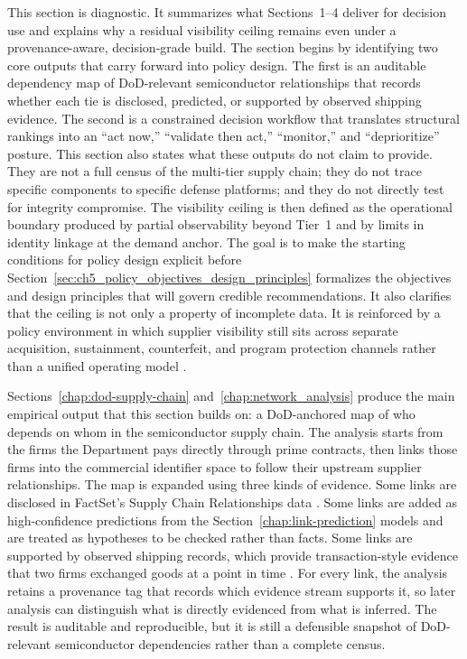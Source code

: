 This section is diagnostic. It summarizes what Sections~1--4 deliver for decision use and explains why a residual visibility ceiling remains even under a provenance-aware, decision-grade build. The section begins by identifying two core outputs that carry forward into policy design. The first is an auditable dependency map of DoD-relevant semiconductor relationships that records whether each tie is disclosed, predicted, or supported by observed shipping evidence. The second is a constrained decision workflow that translates structural rankings into an ``act now,'' ``validate then act,'' ``monitor,'' and ``deprioritize'' posture. This section also states what these outputs do not claim to provide. They are not a full census of the multi-tier supply chain; they do not trace specific components to specific defense platforms; and they do not directly test for integrity compromise. The visibility ceiling is then defined as the operational boundary produced by partial observability beyond Tier~1 and by limits in identity linkage at the demand anchor. The goal is to make the starting conditions for policy design explicit before Section~\ref{sec:ch5_policy_objectives_design_principles} formalizes the objectives and design principles that will govern credible recommendations. It also clarifies that the ceiling is not only a property of incomplete data. It is reinforced by a policy environment in which supplier visibility still sits across separate acquisition, sustainment, counterfeit, and program protection channels rather than a unified operating model \parencite{ch5_dod2022_supplychains,U.S.GovernmentAccountabilityOffice2025}.

Sections~\ref{chap:dod-supply-chain} and~\ref{chap:network_analysis} produce the main empirical output that this section builds on: a DoD-anchored map of who depends on whom in the semiconductor supply chain. The analysis starts from the firms the Department pays directly through prime contracts, then links those firms into the commercial identifier space to follow their upstream supplier relationships. The map is expanded using three kinds of evidence. Some links are disclosed in FactSet's Supply Chain Relationships data \parencite{factset_supply_2024}. Some links are added as high-confidence predictions from the Section~\ref{chap:link-prediction} models and are treated as hypotheses to be checked rather than facts. Some links are supported by observed shipping records, which provide transaction-style evidence that two firms exchanged goods at a point in time \parencite{factset_factset_2025}. For every link, the analysis retains a provenance tag that records which evidence stream supports it, so later analysis can distinguish what is directly evidenced from what is inferred. The result is auditable and reproducible, but it is still a defensible snapshot of DoD-relevant semiconductor dependencies rather than a complete census.

